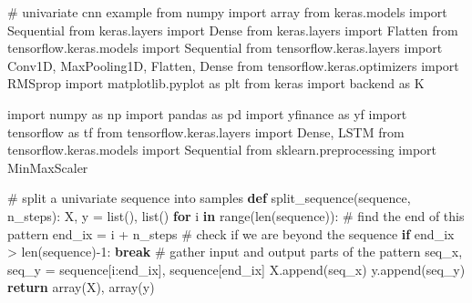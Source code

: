 \documentclass[
  us-letterpaper,
]{scrreprt}
\newenvironment{Shaded}{\begin{snugshade}}{\end{snugshade}}
\newcommand{\BuiltInTok}[1]{\textcolor[rgb]{0.00,0.23,0.31}{#1}}
\newcommand{\CommentTok}[1]{\textcolor[rgb]{0.37,0.37,0.37}{#1}}
\newcommand{\ControlFlowTok}[1]{\textcolor[rgb]{0.00,0.23,0.31}{\textbf{#1}}}
\newcommand{\DecValTok}[1]{\textcolor[rgb]{0.68,0.00,0.00}{#1}}
\newcommand{\ImportTok}[1]{\textcolor[rgb]{0.00,0.46,0.62}{#1}}
\newcommand{\KeywordTok}[1]{\textcolor[rgb]{0.00,0.23,0.31}{\textbf{#1}}}
\newcommand{\NormalTok}[1]{\textcolor[rgb]{0.00,0.23,0.31}{#1}}
\newcommand{\OperatorTok}[1]{\textcolor[rgb]{0.37,0.37,0.37}{#1}}
\theoremstyle{plain}
\theoremstyle{definition}
\theoremstyle{definition}
\theoremstyle{remark}
\begin{document}
\begin{Shaded}
\begin{Highlighting}[]
\CommentTok{\# univariate cnn example}
\ImportTok{from}\NormalTok{ numpy }\ImportTok{import}\NormalTok{ array}
\ImportTok{from}\NormalTok{ keras.models }\ImportTok{import}\NormalTok{ Sequential}
\ImportTok{from}\NormalTok{ keras.layers }\ImportTok{import}\NormalTok{ Dense}
\ImportTok{from}\NormalTok{ keras.layers }\ImportTok{import}\NormalTok{ Flatten}
\ImportTok{from}\NormalTok{ tensorflow.keras.models }\ImportTok{import}\NormalTok{ Sequential}
\ImportTok{from}\NormalTok{ tensorflow.keras.layers }\ImportTok{import}\NormalTok{ Conv1D, MaxPooling1D, Flatten, Dense}
\ImportTok{from}\NormalTok{ tensorflow.keras.optimizers }\ImportTok{import}\NormalTok{ RMSprop}
\ImportTok{import}\NormalTok{ matplotlib.pyplot }\ImportTok{as}\NormalTok{ plt}
\ImportTok{from}\NormalTok{ keras }\ImportTok{import}\NormalTok{ backend }\ImportTok{as}\NormalTok{ K}

\ImportTok{import}\NormalTok{ numpy }\ImportTok{as}\NormalTok{ np}
\ImportTok{import}\NormalTok{ pandas }\ImportTok{as}\NormalTok{ pd}
\ImportTok{import}\NormalTok{ yfinance }\ImportTok{as}\NormalTok{ yf}
\ImportTok{import}\NormalTok{ tensorflow }\ImportTok{as}\NormalTok{ tf}
\ImportTok{from}\NormalTok{ tensorflow.keras.layers }\ImportTok{import}\NormalTok{ Dense, LSTM}
\ImportTok{from}\NormalTok{ tensorflow.keras.models }\ImportTok{import}\NormalTok{ Sequential}
\ImportTok{from}\NormalTok{ sklearn.preprocessing }\ImportTok{import}\NormalTok{ MinMaxScaler }


\CommentTok{\# split a univariate sequence into samples}
\KeywordTok{def}\NormalTok{ split\_sequence(sequence, n\_steps):}
\NormalTok{    X, y }\OperatorTok{=} \BuiltInTok{list}\NormalTok{(), }\BuiltInTok{list}\NormalTok{()}
    \ControlFlowTok{for}\NormalTok{ i }\KeywordTok{in} \BuiltInTok{range}\NormalTok{(}\BuiltInTok{len}\NormalTok{(sequence)):}
        \CommentTok{\# find the end of this pattern}
\NormalTok{        end\_ix }\OperatorTok{=}\NormalTok{ i }\OperatorTok{+}\NormalTok{ n\_steps}
        \CommentTok{\# check if we are beyond the sequence}
        \ControlFlowTok{if}\NormalTok{ end\_ix }\OperatorTok{\textgreater{}} \BuiltInTok{len}\NormalTok{(sequence)}\OperatorTok{{-}}\DecValTok{1}\NormalTok{:}
            \ControlFlowTok{break}
        \CommentTok{\# gather input and output parts of the pattern}
\NormalTok{        seq\_x, seq\_y }\OperatorTok{=}\NormalTok{ sequence[i:end\_ix], sequence[end\_ix]}
\NormalTok{        X.append(seq\_x)}
\NormalTok{        y.append(seq\_y)}
    \ControlFlowTok{return}\NormalTok{ array(X), array(y)}



\end{Highlighting}
\end{Shaded}
\end{document}

